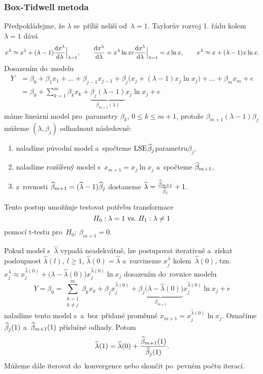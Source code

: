 \subsubsection*{Box-Tidwell metoda}
Předpokládejme, že $\lambda$ se~příliš neliší od~$\lambda = 1$. Taylorův rozvoj 1. řádu kolem~$\lambda = 1$ dává
 $$
x^\lambda\approx x^1+(\lambda-1)\frac{\mathrm{d} x^\lambda}{\mathrm{d} \lambda}\Big|_{\lambda = 1},\qquad \frac{\mathrm{d} x^\lambda}{\mathrm{d} \lambda} = x^\lambda\ln x c \frac{\mathrm{d} x^\lambda}{\mathrm{d} \lambda}\Big|_{\lambda = 1} = x\ln x,\qquad x^\lambda\approx x+(\lambda-1)x\ln x.
 $$
Dosazením do~modelu
\begin{align*}
	Y & = \beta_0+\beta_1 x_1+...+\beta_{j-1}x_{j-1}+\beta_j\big(x_j+(\lambda-1)x_j\ln x_j\big)+...+\beta_m x_m+e \\
	& = \beta_0+\sum_{k = 1}^m \beta_k x_k+\underbrace{\beta_j(\lambda-1)}_{\beta_{m+1}(\lambda)}x_j\ln x_j+e
\end{align*}
máme lineární model pro~parametry $\beta_k$, $0\leq k\leq m+1$, protože $\beta_{m+1}(\lambda-1)\beta_j$ můžeme $(\lambda,\beta_j)$ odhadnout následovně:
\begin{enumerate}[1)]
	\item naladíme původní model a~spočteme $\mathrm{LSE}$$ \widehat{\beta}_j $parametru$ \beta_j $,
	\item naladíme rozšířený model s~$x_{m+1} = x_j\ln x_j$ a~spočteme $\widehat{\beta}_{m+1}$,
	\item z~rovnosti $\widehat{\beta}_{m+1} = (\widehat{\lambda}-1)\widehat{\beta}_j$ dostaneme $\widehat{\lambda} = \frac{\widehat{\beta}_{m+1}}{\widehat{\beta}_j}+1$.
\end{enumerate}
Tento postup umožňuje testovat potřebu transformace
 $$ H_0: \lambda = 1 ~\text{vs.}~ H_1: \lambda\neq1 $$
pomocí t-testu pro~$H_0:~\beta_{m+1} = 0$.

\begin{remark}
Pokud model s~$\widehat{\lambda}$ vypadá neadekvátně, lze postupovat iterativně a~získat posloupnost $\widehat{\lambda}(l),~l\geq1$, $\widehat{\lambda}(0) = \widehat{\lambda}$ a~rozvineme $x_j^\lambda$ kolem~$\widehat{\lambda}(0)$, tzn. \\ $x_j^\lambda\approx x_j^{\widehat{\lambda}(0)}+\big(\lambda-\widehat{\lambda}(0)\big)x_j^{\widehat{\lambda}(0)}\ln x_j$ dosazením do~rovnice modelu
 $$
Y = \beta_0 = \sum_{\substack{k = 1 \\ k\neq j}}^m \beta_k x_k+\beta_j x_j^{\widehat{\lambda}(0)}+\underbrace{\beta_j\big(\lambda-\widehat{\lambda}(0)\big)}_{\beta_{m+1}}x_j^{\widehat{\lambda}(0)}\ln x_j+e
 $$
naladíme tento model s~a~bez~přidané proměnné $x_{m+1} = x_j^{\widehat{\lambda}(0)}\ln x_j$. Označíme $\widehat{\beta}_j(1)$ a~$\widehat{\beta}_{m+1}(1)$ příslušné odhady. Potom
 $$
\widehat{\lambda}(1) = \widehat{\lambda}(0)+\frac{\widehat{\beta}_{m+1}(1)}{\widehat{\beta}_j(1)}.
 $$
Můžeme dále iterovat do~konvergence nebo skončit po~pevném počtu iterací.
\end{remark}

